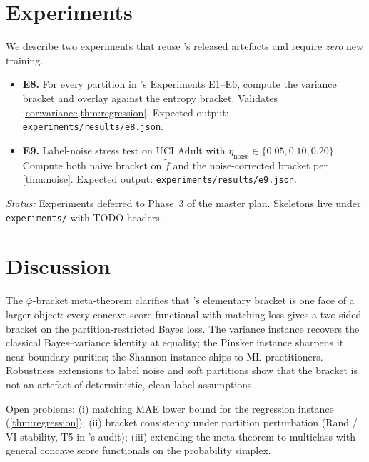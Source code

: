 \documentclass[10pt]{article}
\theoremstyle{definition}
\theoremstyle{remark}
\newcommand{\bphi}{\bar{\varphi}}        %
\newcommand{\status}[1]{\par\noindent\emph{Status:} #1}
\begin{document}
\section{Experiments}\label{sec:exp}

We describe two experiments that reuse 's
released artefacts and require \emph{zero} new training.
\begin{itemize}[leftmargin=*,nosep]
  \item \textbf{E8.} For every partition in 's
    Experiments E1--E6, compute the variance bracket and overlay
    against the entropy bracket. Validates
    \cref{cor:variance,thm:regression}. Expected output:
    \texttt{experiments/results/e8.json}.
  \item \textbf{E9.} Label-noise stress test on UCI Adult with
    $\eta_{\mathrm{noise}}\in\{0.05,0.10,0.20\}$. Compute both
    naive bracket on $\tilde f$ and the noise-corrected
    bracket per \cref{thm:noise}. Expected output:
    \texttt{experiments/results/e9.json}.
\end{itemize}
\status{Experiments deferred to Phase~3 of the master plan.
Skeletons live under \texttt{experiments/} with TODO headers.}

\section{Discussion}\label{sec:disc}

The $\bphi$-bracket meta-theorem clarifies that
's elementary bracket is one face of a
larger object: every concave score functional with matching
loss gives a two-sided bracket on the partition-restricted
Bayes loss. The variance instance recovers the classical
Bayes--variance identity at equality; the Pinsker instance
sharpens it near boundary purities; the Shannon instance ships
to ML practitioners. Robustness extensions to label noise and
soft partitions show that the bracket is not an artefact of
deterministic, clean-label assumptions.

Open problems: (i) matching MAE lower bound for the regression
instance (\cref{thm:regression}); (ii) bracket consistency
under partition perturbation (Rand / VI stability, T5 in
's audit); (iii) extending the meta-theorem
to multiclass with general concave score functionals on the
probability simplex.



\end{document}
